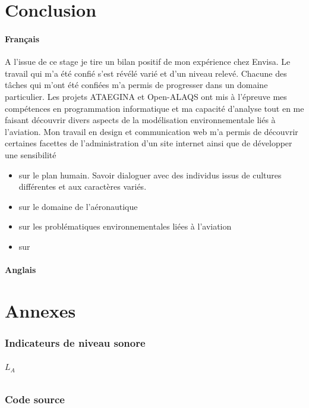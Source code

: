 \documentclass[a4paper,12pt,twoside]{article}
\begin{document}
    \part{Conclusion}
    \subsection*{Français}
    A l'issue de ce stage je tire un bilan positif de mon expérience chez Envisa. Le travail qui m'a été confié s'est révélé varié et d'un niveau relevé. Chacune des tâches qui m'ont été confiées m'a permis de progresser dans un domaine particulier. Les projets ATAEGINA et Open-ALAQS ont mis à l'épreuve mes compétences en programmation informatique et ma capacité d'analyse tout en me faisant découvrir divers aspects de la modélisation environnementale liés à l'aviation. Mon travail en design et communication web m'a permis de découvrir certaines facettes de l'administration d'un site internet ainsi que de développer une sensibilité
    
    \begin{itemize}
        \item sur le plan humain. Savoir dialoguer avec des individus issus de cultures différentes et aux caractères variés.
        \item sur le domaine de l'aéronautique
        \item sur les problématiques environnementales liées à l'aviation
        \item sur 
    \end{itemize}
    \newpage
    \subsection*{Anglais}
    \newpage
    
    \appendix
    \part*{Annexes}
    \section{Indicateurs de niveau sonore}
    \paragraph{$L_{A}$}
    \newpage
    
    \section{Code source}
\end{document}
